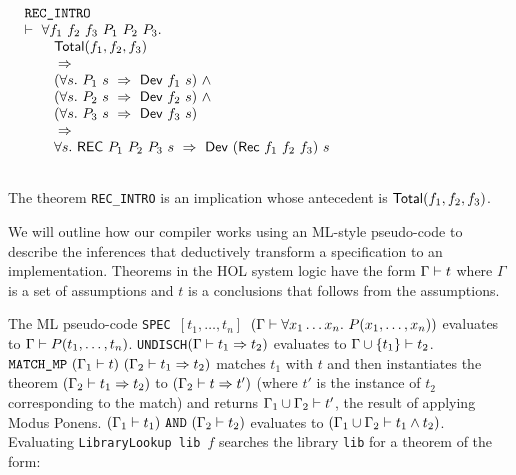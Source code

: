 \documentclass{llncs}
\begin{document}
\vspace*{-3mm}
$$\begin{array}{l}
\texttt{REC\_INTRO}\\
\TURNST\ \forall f_1~f_2~f_3~P_1~P_2~P_3.\\
\phantom{\TURNST\ \forall~}
\DEF{Total}(f_1,f_2,f_3)\\
\phantom{\TURNST\ \forall~}
\IMP\\
\phantom{\TURNST\ \forall~}
(\forall s.~P_1~s \ \IMP\ \DEF{Dev}~f_1~s)~\AND\\
\phantom{\TURNST\ \forall~}
(\forall s.~P_2~s \ \IMP\ \DEF{Dev}~f_2~s)~\AND\\
\phantom{\TURNST\ \forall~}
(\forall s.~P_3~s \ \IMP\ \DEF{Dev}~f_3~s)\\
\phantom{\TURNST\ \forall~}
\IMP\\
\phantom{\TURNST\ \forall~}
\forall s.~ \DEF{REC}\ P_1\ P_2\ P_3\ s\ 
 \IMP \ \DEF{Dev}\ (\DEF{Rec}~f_1~f_2~f_3)\ s\\
\phantom{~~~~~~~~~~~~~~~~~~~~~~~~~~~~~~~~~~~~~~~~~~~~~~~~~~~~~~~~~~~~~~~~~~~~~~~~~~~~~~~~~~~~~~~~~~~~~~~~~~~~~}
\end{array}$$

\noindent The theorem \texttt{REC\_INTRO} is an implication whose antecedent  is
$\mathsf{Total}(f_1,f_2,f_3)$.

We will outline how our compiler works using an ML-style pseudo-code to
describe the inferences that deductively transform a specification to
an implementation. Theorems in the HOL system logic have the form
$\Gamma\vdash t$ where $\Gamma$ is a set of assumptions and $t$ is a
conclusions that follows from the assumptions.


The ML pseudo-code \texttt{SPEC~$[t_1,\ldots,t_n]$~$(\Gamma \vdash \forall x_1\ldots x_n.~P(x_1,\ldots,x_n))$}
evaluates to $\Gamma\vdash P(t_1,\ldots,t_n)$. 
\texttt{UNDISCH$(\Gamma\vdash t_1\Rightarrow t_2)$}
evaluates to \texttt{$\Gamma\cup\{t_1\}\vdash t_2$}.
$\texttt{MATCH\_MP}~(\Gamma_1 \vdash t)~(\Gamma_2\vdash t_1\Rightarrow t_2)$ matches $t_1$
with $t$ and then instantiates the theorem $(\Gamma_2 \vdash t_1\Rightarrow t_2)$ to
$(\Gamma_2 \vdash t\Rightarrow t')$ (where $t'$ is the instance of $t_2$
corresponding to the match) and returns $\Gamma_1\cup\Gamma_2 \vdash t'$, the result of
applying Modus Ponens.  
$(\Gamma_1 \vdash
t_1)~\texttt{AND}~(\Gamma_2 \vdash t_2)$ evaluates to $(\Gamma_1\cup\Gamma_2 \vdash t_1 \wedge t_2)$.
Evaluating \texttt{LibraryLookup~lib~$f$} searches the library \texttt{lib}
for a theorem  of the form:
\end{document}
